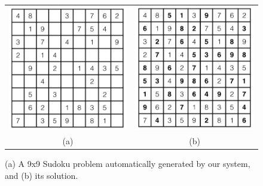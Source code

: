 \begin{figure}[!htpb]
\centering
\begin{tabular}{c c}
\includegraphics[scale=0.40]{puzzlefigs/sudoku_prob.png}
&
\includegraphics[scale=0.40]{puzzlefigs/sudoku_sol.png}
\\
(a) & (b)
\end{tabular}
\caption{(a) A 9x9 Sudoku problem automatically generated by our system, and (b) its solution.}
\label{Sudokuprobsol}
\end{figure}


